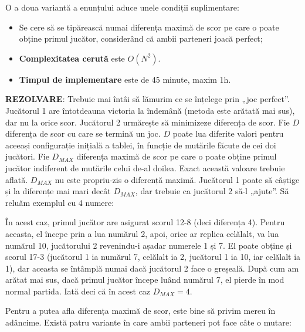 O a doua variantă a enunțului aduce unele condiții suplimentare:

\begin{itemize}

\item Se cere să se tipărească numai diferența maximă de scor pe care o poate
  obține primul jucător, considerând că ambii parteneri joacă perfect;

\item {\bf Complexitatea cerută} este $O(N^2)$.

\item {\bf Timpul de implementare} este de 45 minute, maxim 1h.

\end{itemize}

{\bf REZOLVARE}: Trebuie mai întâi să lămurim ce se înțelege prin „joc
perfect”. Jucătorul 1 are întotdeauna victoria la îndemână (metoda este
arătată mai sus), dar nu la orice scor. Jucătorul 2 urmărește să minimizeze
diferența de scor. Fie $D$ diferența de scor cu care se termină un joc. $D$
poate lua diferite valori pentru aceeași configurație inițială a tablei, în
funcție de mutările făcute de cei doi jucători. Fie $D_{MAX}$ diferența maximă
de scor pe care o poate obține primul jucător indiferent de mutările celui
de-al doilea. Exact această valoare trebuie aflată. $D_{MAX}$ nu este
propriu-zis o diferență maximă. Jucătorul 1 poate să câștige și la diferențe
mai mari decât $D_{MAX}$, dar trebuie ca jucătorul 2 să-l „ajute”. Să reluăm
exemplul cu 4 numere:


În acest caz, primul jucător are asigurat scorul 12-8 (deci diferența
4). Pentru aceasta, el începe prin a lua numărul 2, apoi, orice ar replica
celălalt, va lua numărul 10, jucătorului 2 revenindu-i așadar numerele 1 și
7. El poate obține și scorul 17-3 (jucătorul 1 ia numărul 7, celălalt ia 2,
jucătorul 1 ia 10, iar celălalt ia 1), dar aceasta se întâmplă numai dacă
jucătorul 2 face o greșeală. După cum am arătat mai sus, dacă primul jucător
începe luând numărul 7, el pierde în mod normal partida. Iată deci că în acest
caz $D_{MAX}=4$.

Pentru a putea afla diferența maximă de scor, este bine să privim mereu în
adâncime. Există patru variante în care ambii parteneri pot face câte o
mutare:

